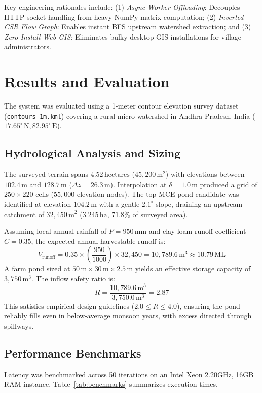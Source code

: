 \documentclass[manuscript,screen,review]{acmart}
\begin{document}
Key engineering rationales include: (1) \emph{Async Worker Offloading}: Decouples HTTP socket handling from heavy NumPy matrix computation; (2) \emph{Inverted CSR Flow Graph}: Enables instant BFS upstream watershed extraction; and (3) \emph{Zero-Install Web GIS}: Eliminates bulky desktop GIS installations for village administrators.

\section{Results and Evaluation}
\label{sec:results}
The system was evaluated using a 1-meter contour elevation survey dataset (\texttt{contours\_1m.kml}) covering a rural micro-watershed in Andhra Pradesh, India ($17.65^\circ\,\text{N}, 82.95^\circ\,\text{E}$).

\subsection{Hydrological Analysis and Sizing}
The surveyed terrain spans $4.52\,\text{hectares}$ ($45,200\,\text{m}^2$) with elevations between $102.4\,\text{m}$ and $128.7\,\text{m}$ ($\Delta z = 26.3\,\text{m}$). Interpolation at $\delta = 1.0\,\text{m}$ produced a grid of $250 \times 220$ cells ($55,000$ elevation nodes). The top MCE pond candidate was identified at elevation $104.2\,\text{m}$ with a gentle $2.1^\circ$ slope, draining an upstream catchment of $32,450\,\text{m}^2$ ($3.245\,\text{ha}$, $71.8\%$ of surveyed area).

Assuming local annual rainfall of $P = 950\,\text{mm}$ and clay-loam runoff coefficient $C = 0.35$, the expected annual harvestable runoff is:
\begin{equation}
    V_{\text{runoff}} = 0.35 \times \left(\frac{950}{1000}\right) \times 32,450 = 10,789.6\,\text{m}^3 \approx 10.79\,\text{ML}
\end{equation}
A farm pond sized at $50\,\text{m} \times 30\,\text{m} \times 2.5\,\text{m}$ yields an effective storage capacity of $3,750\,\text{m}^3$. The inflow safety ratio is:
\begin{equation}
    R = \frac{10,789.6\,\text{m}^3}{3,750.0\,\text{m}^3} = 2.87
\end{equation}
This satisfies empirical design guidelines ($2.0 \le R \le 4.0$), ensuring the pond reliably fills even in below-average monsoon years, with excess directed through spillways.

\subsection{Performance Benchmarks}
Latency was benchmarked across 50 iterations on an Intel Xeon 2.20GHz, 16GB RAM instance. Table~\ref{tab:benchmarks} summarizes execution times.
\end{document}

